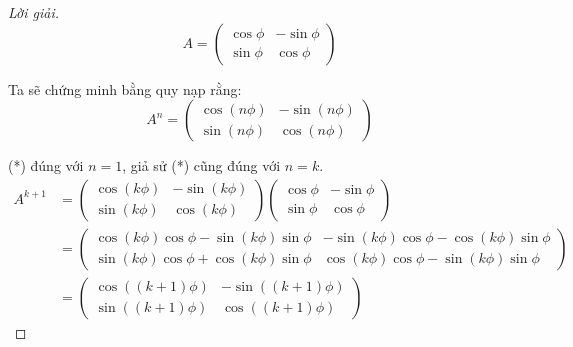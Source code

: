 \begin{proof}[Lời giải]
              \[
                  A = \begin{pmatrix}
                      \cos\phi & -\sin\phi \\
                      \sin\phi & \cos\phi
                  \end{pmatrix}
              \]
              
              Ta sẽ chứng minh bằng quy nạp rằng:
              \[
                  A^{n} =
                  \begin{pmatrix}
                      \cos(n\phi) & -\sin(n\phi) \\
                      \sin(n\phi) & \cos(n\phi)
                  \end{pmatrix}
                  \tag{*}
              \]
            
              (*) đúng với $n = 1$, giả sử (*) cũng đúng với $n = k$.
              \begin{align*}
                  A^{k+1} & =
                  \begin{pmatrix}
                      \cos(k\phi) & -\sin(k\phi) \\
                      \sin(k\phi) & \cos(k\phi)
                  \end{pmatrix}
                  \begin{pmatrix}
                      \cos\phi & -\sin\phi \\
                      \sin\phi & \cos\phi
                  \end{pmatrix}                                                                   \\
                          & =
                  \begin{pmatrix}
                      \cos(k\phi)\cos\phi - \sin(k\phi)\sin\phi & -\sin(k\phi)\cos\phi - \cos(k\phi)\sin\phi \\
                      \sin(k\phi)\cos\phi + \cos(k\phi)\sin\phi & \cos(k\phi)\cos\phi - \sin(k\phi)\sin\phi
                  \end{pmatrix} \\
                          & =
                  \begin{pmatrix}
                      \cos((k+1)\phi) & -\sin((k+1)\phi) \\
                      \sin((k+1)\phi) & \cos((k+1)\phi)
                  \end{pmatrix}
              \end{align*}
              

\end{proof}
